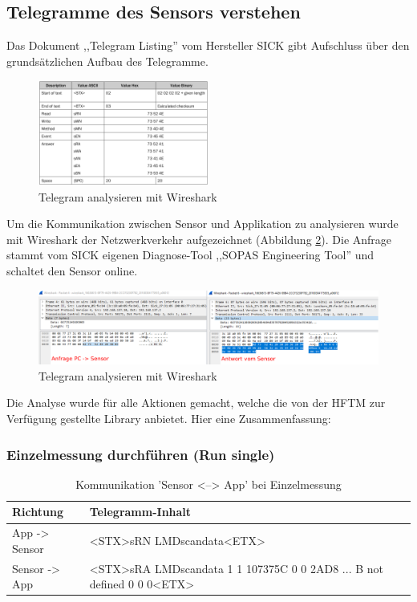 \subsection{Telegramme des Sensors verstehen}
Das Dokument ,,Telegram Listing'' \cite{tim55x-telegram-listing} vom Hersteller SICK gibt Aufschluss über den grundsätzlichen Aufbau des Telegramme.
\begin{figure}[H]
	\centering
	\includegraphics[width=0.5\textwidth]{img/tim55x-telegram-commands.png}
	\caption{Telegram analysieren mit Wireshark}
	\label{fig:tim55x-telegram-commands}
\end{figure}

Um die Kommunikation zwischen Sensor und Applikation zu analysieren wurde mit Wireshark der Netzwerkverkehr aufgezeichnet (Abbildung \ref{fig:tim55x-telegram-wireshark}). Die Anfrage stammt vom SICK eigenen Diagnose-Tool ,,SOPAS Engineering Tool'' und schaltet den Sensor online.
\begin{figure}[H]
	\centering
	\includegraphics[width=1.0\textwidth]{img/tim55x-telegram-wireshark.pdf}
	\caption{Telegram analysieren mit Wireshark}
	\label{fig:tim55x-telegram-wireshark}
\end{figure}

Die Analyse wurde für alle Aktionen gemacht, welche die von der HFTM zur Verfügung gestellte Library anbietet. Hier eine Zusammenfassung:

\subsubsection{Einzelmessung durchführen (Run single)}
\begin{table}[H]
	\centering
	\begin{tabular}{lp{13cm}} \toprule
		\textbf{Richtung} 	& \textbf{Telegramm-Inhalt}							\\ \midrule
		App -> Sensor		& <STX>sRN LMDscandata<ETX> 							\\ \midrule
		Sensor -> App		& <STX>sRA LMDscandata 1 1 107375C 0 0 2AD8 ... B not defined 0 0 0<ETX>	\\ \bottomrule
	\end{tabular}
	\caption{Kommunikation 'Sensor <--> App' bei Einzelmessung}
	\label{tab:commSingle}
\end{table}

